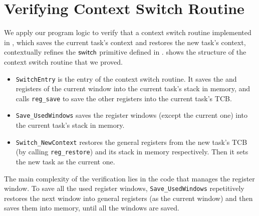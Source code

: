 \section{Verifying Context Switch Routine}
\label{sec:ctxswitch}

\indent
We apply our program logic to verify
that a context switch routine implemented in \sparc,
which saves the current task's context and
restores the new task's context,
contextually refines the $\mathsf{switch}{}$ primitive
defined in \Subsec{\ref{subsec:High-level Pseudo-SPARCv8 Language}}.
\Fig{\ref{fig:The Structure of Context Switch Routine}}
shows the structure of the context switch routine that we proved.
\begin{center}
    
	\label{fig:The Structure of Context Switch Routine}
\end{center}
\begin{itemize}
    \item \texttt{SwitchEntry}
    is the entry of the context switch routine.
    It saves the \localRN{} and \inRN{} registers of the current
    window into the current task's stack in memory, and calls
    \texttt{reg\_save} to save the other registers into 
    the current task's TCB.

    \item
    \texttt{Save\_UsedWindows} saves
	the register windows (except the current one)
    into the current task's stack in memory.

    \item
    \texttt{Switch\_NewContext}
    restores the general registers from the new task's TCB
    (by calling \texttt{reg\_restore})
    and its stack in memory
    respectively. Then it sets the new task as
    the current one.
\end{itemize}

The main complexity of the verification lies in
the code that manages the register window.
To save all the used
register windows, \texttt{Save\_UsedWindows}
repetitively restores the next window into general registers
(as the current window)
and then saves them into memory, until all the windows are saved.

